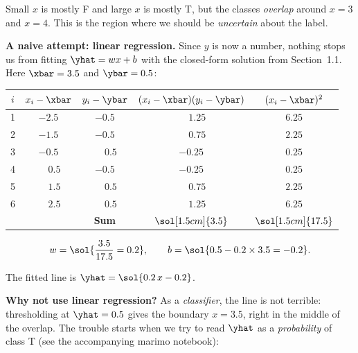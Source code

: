 \documentclass[12pt, a4paper]{article}
\begin{document}
Small $x$ is mostly F and large $x$ is mostly T, but the classes
\emph{overlap} around $x = 3$ and $x = 4$.
This is the region where we should be \emph{uncertain} about the label.



\textbf{A naive attempt: linear regression.}
Since $y$ is now a number, nothing stops us from fitting $\yhat = wx + b$
with the closed-form solution from Section~1.1.
Here $\xbar = 3.5$ and $\ybar = 0.5$:

\begin{center}
  \renewcommand{\arraystretch}{1.3}
  \begin{tabular}{ccccc}
    \toprule
    $i$ & $x_i - \xbar$            & $y_i - \ybar$
        & $(x_i-\xbar)(y_i-\ybar)$ & $(x_i-\xbar)^2$                                             \\
    \midrule
    1   & $-2.5$                   & $-0.5$           & $\phantom{-}1.25$  & $6.25$              \\
    2   & $-1.5$                   & $-0.5$           & $\phantom{-}0.75$  & $2.25$              \\
    3   & $-0.5$                   & $\phantom{-}0.5$ & $-0.25$            & $0.25$              \\
    4   & $\phantom{-}0.5$         & $-0.5$           & $-0.25$            & $0.25$              \\
    5   & $\phantom{-}1.5$         & $\phantom{-}0.5$ & $\phantom{-}0.75$  & $2.25$              \\
    6   & $\phantom{-}2.5$         & $\phantom{-}0.5$ & $\phantom{-}1.25$  & $6.25$              \\
    \midrule
        &                          & \textbf{Sum}     & $\sol[1.5cm]{3.5}$ & $\sol[1.5cm]{17.5}$ \\
    \bottomrule
  \end{tabular}
\end{center}

\[
  w = \sol{\dfrac{3.5}{17.5} = 0.2},
  \qquad
  b = \sol{0.5 - 0.2 \times 3.5 = -0.2}.
\]

The fitted line is $\yhat = \sol{0.2\,x - 0.2}$.

\textbf{Why not use linear regression?}
As a \emph{classifier}, the line is not terrible: thresholding at
$\yhat = 0.5$ gives the boundary $x = 3.5$, right in the middle of the
overlap.
The trouble starts when we try to read $\yhat$ as a
\emph{probability} of class T (see the accompanying marimo notebook):
\end{document}
